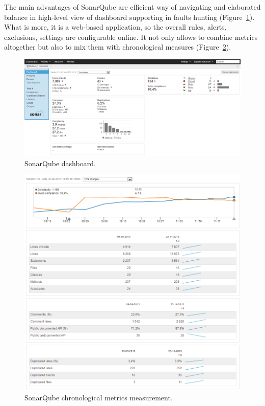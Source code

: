 The main advantages of SonarQube are efficient way of navigating and elaborated balance in high-level view of dashboard supporting in faults hunting (Figure~\ref{fig:sonar1}). What is more, it is a web-based application, so the overall rules, alerts, exclusions, settings are configurable online. It not only allows to combine metrics altogether but also to mix them with chronological measures (Figure~\ref{fig:sonar2}).

\begin{figure}[h!]
	\centering
	\includegraphics[scale=0.45]{img/sonar2.png} 
	\caption{SonarQube dashboard.}		
	\label{fig:sonar1}
\end{figure}


\begin{figure}[h!]
	\centering
	\includegraphics[scale=0.45]{img/sonar4.png} 
	\caption{SonarQube chronological metrics measurement.}		
	\label{fig:sonar2}
\end{figure}




